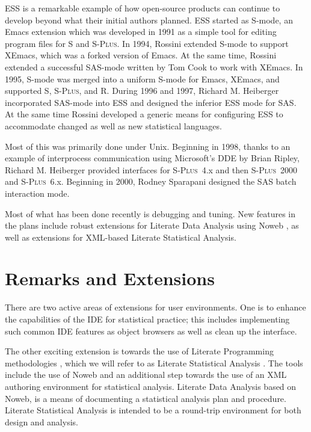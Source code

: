 \documentclass{article}
\newcommand*{\Splus}{\textsc{S-Plus}}
\begin{document}
ESS is a remarkable example of how open-source products can continue
to develop beyond what their initial authors planned.  ESS started as
S-mode, an Emacs extension which was developed in 1991 as a simple
tool for editing program files for S and \Splus.  In 1994, Rossini
extended S-mode to support XEmacs, which was a forked version of
Emacs.  At the same time, Rossini extended a successful SAS-mode
written by Tom Cook to work with XEmacs.  In 1995, S-mode was merged
into a uniform S-mode for Emacs, XEmacs, and supported S, \Splus, and
R. During 1996 and 1997, Richard M. Heiberger incorporated 
SAS-mode into ESS and designed the inferior ESS mode for SAS.
At the same time Rossini developed a
generic means for configuring ESS to accommodate changed as well as
new statistical languages.

Most of this was primarily done under Unix.  Beginning in 1998, thanks
to an example of interprocess communication using Microsoft's DDE by
Brian Ripley, Richard M. Heiberger provided interfaces for \Splus~4.x
and then \Splus~2000 and \Splus~6.x.  Beginning in 2000, Rodney
Sparapani designed the SAS batch interaction mode.

Most of what has been done recently is debugging and tuning.  New
features in the plans include robust extensions for Literate Data
Analysis using Noweb \citep{NRamsey:1994}, as well as extensions for
XML-based Literate Statistical Analysis.

\section{Remarks and Extensions}
\label{sec:remarks}

There are two active areas of extensions for user environments.  One
is to enhance the capabilities of the IDE for statistical practice;
this includes implementing such common IDE features as object browsers
as well as clean up the interface.

The other exciting extension is towards the use of Literate
Programming methodologies \citep{Knuth:1992,NRamsey:1994}, which we
will refer to as Literate Statistical Analysis \citep{ross:lunt:2001}.
The tools include the use of Noweb \citep{NRamsey:1994} and an
additional step towards the use of an XML authoring environment for
statistical analysis.  Literate Data Analysis based on Noweb, is a
means of documenting a statistical analysis plan and procedure.
Literate Statistical Analysis is intended to be a round-trip
environment for both design and analysis.
\end{document}
